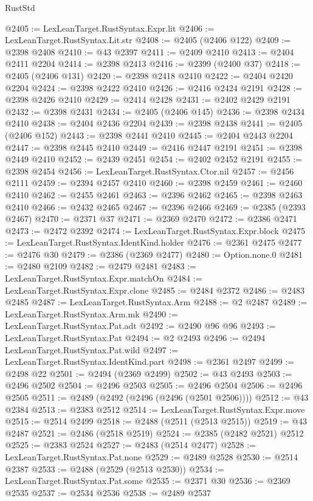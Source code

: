\begin{lexlean}{RustStd}
\begin{coremodule}
@2405 := LexLeanTarget.RustSyntax.Expr.lit
@2406 := LexLeanTarget.RustSyntax.Lit.str
@2408 := @2405 (@2406 @122)
@2409 := @2398 @2408
@2410 := @43 @2397
@2411 := @2409 @2410
@2413 := @2404 @2411 @2204
@2414 := @2398 @2413
@2416 := @2399 (@2400 @37)
@2418 := @2405 (@2406 @131)
@2420 := @2398 @2418 @2410
@2422 := @2404 @2420 @2204
@2424 := @2398 @2422 @2410
@2426 := @2416 @2424 @2191
@2428 := @2398 @2426 @2410
@2429 := @2414 @2428
@2431 := @2402 @2429 @2191
@2432 := @2398 @2431
@2434 := @2405 (@2406 @145)
@2436 := @2398 @2434 @2410
@2438 := @2404 @2436 @2204
@2439 := @2398 @2438
@2441 := @2405 (@2406 @152)
@2443 := @2398 @2441 @2410
@2445 := @2404 @2443 @2204
@2447 := @2398 @2445 @2410
@2449 := @2416 @2447 @2191
@2451 := @2398 @2449 @2410
@2452 := @2439 @2451
@2454 := @2402 @2452 @2191
@2455 := @2398 @2454
@2456 := LexLeanTarget.RustSyntax.Ctor.nil
@2457 := @2456 @2111
@2459 := @2394 @2457 @2410
@2460 := @2398 @2459
@2461 := @2460 @2410
@2462 := @2455 @2461
@2463 := @2396 @2462
@2465 := @2398 @2463 @2410
@2466 := @2432 @2465
@2467 := @2396 @2466
@2469 := @2385 (@2393 @2467)
@2470 := @2371 @37
@2471 := @2369 @2470
@2472 := @2386 @2471
@2473 := @2472 @2392
@2474 := LexLeanTarget.RustSyntax.Expr.block
@2475 := LexLeanTarget.RustSyntax.IdentKind.holder
@2476 := @2361 @2475
@2477 := @2476 @30
@2479 := @2386 (@2369 @2477)
@2480 := Option.none.{0}
@2481 := @2480 @2109
@2482 := @2479 @2481
@2483 := LexLeanTarget.RustSyntax.Expr.matchOn
@2484 := LexLeanTarget.RustSyntax.Expr.clone
@2485 := @2484 @2372
@2486 := @2483 @2485
@2487 := LexLeanTarget.RustSyntax.Arm
@2488 := @2 @2487
@2489 := LexLeanTarget.RustSyntax.Arm.mk
@2490 := LexLeanTarget.RustSyntax.Pat.adt
@2492 := @2490 @96 @96
@2493 := LexLeanTarget.RustSyntax.Pat
@2494 := @2 @2493
@2496 := @2494 LexLeanTarget.RustSyntax.Pat.wild
@2497 := LexLeanTarget.RustSyntax.IdentKind.part
@2498 := @2361 @2497
@2499 := @2498 @22
@2501 := @2494 (@2369 @2499)
@2502 := @43 @2493
@2503 := @2496 @2502
@2504 := @2496 @2503
@2505 := @2496 @2504
@2506 := @2496 @2505
@2511 := @2489 (@2492 (@2496 (@2496 (@2501 @2506))))
@2512 := @43 @2384
@2513 := @2383 @2512
@2514 := LexLeanTarget.RustSyntax.Expr.move
@2515 := @2514 @2499
@2518 := @2488 (@2511 (@2513 @2515))
@2519 := @43 @2487
@2521 := @2486 (@2518 @2519)
@2524 := @2385 (@2482 @2521) @2512
@2525 := @2383 @2524
@2527 := @2483 (@2514 @2477)
@2528 := LexLeanTarget.RustSyntax.Pat.none
@2529 := @2489 @2528
@2530 := @2514 @2387
@2533 := @2488 (@2529 (@2513 @2530))
@2534 := LexLeanTarget.RustSyntax.Pat.some
@2535 := @2371 @30
@2536 := @2369 @2535
@2537 := @2534 @2536
@2538 := @2489 @2537

\end{coremodule}
\end{lexlean}
